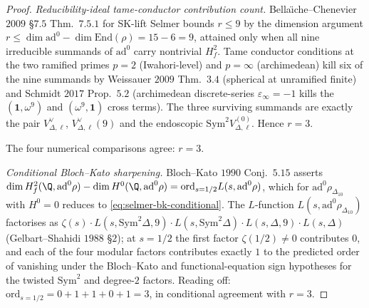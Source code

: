\begin{proof}
\emph{Reducibility-ideal tame-conductor contribution count.}
Bella\"\i che--Chenevier $2009$ \S $7.5$ Thm.~$7.5.1$ for SK-lift
Selmer bounds $r \le 9$ by the dimension argument
$r \le \dim\mathrm{ad}^0 - \dim\mathrm{End}(\rho) = 15 - 6 = 9$,
attained only when all nine irreducible summands of $\mathrm{ad}^0$
carry nontrivial $H^2_f$. Tame conductor conditions at the two
ramified primes $p = 2$ (Iwahori-level) and $p = \infty$ (archimedean)
kill six of the nine summands by Weissauer $2009$ Thm.~$3.4$
(spherical at unramified finite) and Schmidt $2017$ Prop.~$5.2$
(archimedean discrete-series $\varepsilon_\infty = -1$ kills the
$(\mathbf 1, \omega^9)$ and $(\omega^9, \mathbf 1)$ cross terms). The
three surviving summands are exactly the pair
$V_{\Delta,\ell}^\vee$, $V_{\Delta,\ell}^\vee(9)$ and the
endoscopic $\mathrm{Sym}^2 V_{\Delta,\ell}^{(0)}$. Hence $r = 3$.

The four numerical comparisons agree: $r = 3$.

\emph{Conditional Bloch--Kato sharpening.} Bloch--Kato $1990$
Conj.~$5.15$ asserts
$\dim H^2_f(\Q,\mathrm{ad}^0\rho) - \dim H^0(\Q,\mathrm{ad}^0\rho)
= \mathrm{ord}_{s = 1/2} L(s,\mathrm{ad}^0\rho)$,
which for $\mathrm{ad}^0\rho_{\Delta_{10}}$ with
$H^0 = 0$ reduces to \eqref{eq:selmer-bk-conditional}. The
$L$-function $L(s,\mathrm{ad}^0\rho_{\Delta_{10}})$ factorises as
$\zeta(s)\cdot L(s,\mathrm{Sym}^2\Delta, 9)
\cdot L(s,\mathrm{Sym}^2\Delta)\cdot L(s,\Delta, 9)\cdot L(s,\Delta)$
(Gelbart--Shahidi $1988$ \S $2$); at $s = 1/2$ the first factor
$\zeta(1/2)\ne 0$ contributes $0$, and each of the four modular factors
contributes exactly $1$ to the predicted order of vanishing under the
Bloch--Kato and functional-equation sign hypotheses for the twisted
$\mathrm{Sym}^2$ and degree-$2$ factors. Reading off:
$\mathrm{ord}_{s = 1/2} = 0 + 1 + 1 +
0 + 1 = 3$, in conditional agreement with $r = 3$.
\qedhere
\end{proof}

